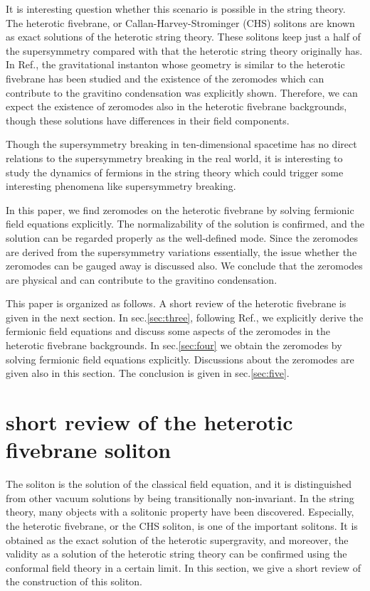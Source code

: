 \documentclass[a4paper,aps, amssymb, preprint, 12pt]{revtex4}
\begin{document}
It is interesting question whether this scenario is possible in the string theory.
The heterotic fivebrane, or Callan-Harvey-Strominger (CHS) solitons are known as exact solutions of the heterotic string theory\cite{CHS}.
These solitons keep just a half of the supersymmetry compared with that the heterotic string theory originally has.
In Ref.\cite{Rey}, the gravitational instanton whose geometry is similar to the heterotic fivebrane has been studied and the existence of the zeromodes which can contribute to the gravitino condensation was explicitly shown.
Therefore, we can expect the existence of zeromodes also in the heterotic fivebrane backgrounds, though these solutions have differences in their field components.

Though the supersymmetry breaking in ten-dimensional spacetime has no direct relations to the supersymmetry breaking in the real world, it is interesting to study the dynamics of fermions in the string theory which could trigger some interesting phenomena like supersymmetry breaking.

In this paper, we find zeromodes on the heterotic fivebrane by solving fermionic field equations explicitly.
The normalizability of the solution is confirmed, and the solution can be regarded properly as the well-defined mode.
Since the zeromodes are derived from the supersymmetry variations essentially, the issue whether the zeromodes can be gauged away is discussed also.
We conclude that the zeromodes are physical and can contribute to the gravitino condensation.

This paper is organized as follows.
A short review of the heterotic fivebrane is given in the next section.
In sec.\ref{sec:three}, following Ref.\cite{Bellisai}, we explicitly derive the fermionic field equations and discuss some aspects of the zeromodes in the heterotic fivebrane backgrounds.
In sec.\ref{sec:four} we obtain the zeromodes by solving fermionic field equations explicitly.
Discussions about the zeromodes are given also in this section.
The conclusion is given in sec.\ref{sec:five}.


\section{short review of the heterotic fivebrane soliton}
\label{sec:two}
The soliton is the solution of the classical field equation, and it is distinguished from other vacuum solutions by being transitionally non-invariant.
In the string theory, many objects with a solitonic property have been discovered.
Especially, the heterotic fivebrane, or the CHS soliton, is one of the important solitons.
It is obtained as the exact solution of the heterotic supergravity, and moreover, the validity as a solution of the heterotic string theory can be confirmed using the conformal field theory in a certain limit.
In this section, we give a short review of the construction of this soliton.
\end{document}
